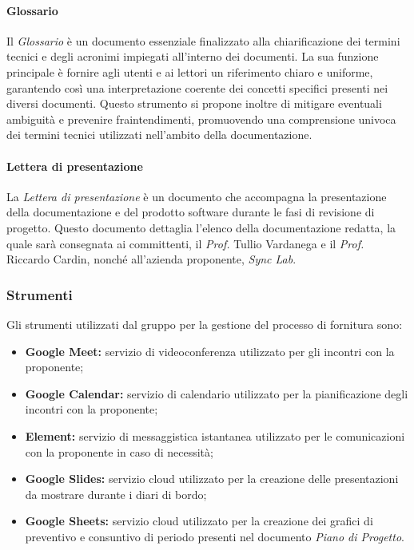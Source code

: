 \paragraph{Glossario}
Il \textit{Glossario} è un documento essenziale finalizzato alla chiarificazione dei termini tecnici e degli acronimi impiegati all'interno dei documenti. La sua funzione principale è fornire agli utenti e ai lettori un riferimento chiaro e uniforme, garantendo così una interpretazione coerente dei concetti specifici presenti nei diversi documenti. Questo strumento si propone inoltre di mitigare eventuali ambiguità e prevenire fraintendimenti, promuovendo una comprensione univoca dei termini tecnici utilizzati nell'ambito della documentazione.

\paragraph{Lettera di presentazione}
La \textit{Lettera di presentazione} è un documento che accompagna la presentazione della documentazione e del prodotto software durante le fasi di revisione di progetto. Questo documento dettaglia l'elenco della documentazione redatta, la quale sarà consegnata ai committenti, il \textit{Prof.} Tullio Vardanega e il \textit{Prof.} Riccardo Cardin, nonché all'azienda proponente, \textit{Sync Lab}.

\subsubsection{Strumenti}
Gli strumenti utilizzati dal gruppo per la gestione del processo di fornitura sono: 
\begin{itemize}
    \item \textbf{Google Meet:}
    servizio di videoconferenza utilizzato per gli incontri con la proponente;
    \item \textbf{Google Calendar:}
    servizio di calendario utilizzato per la pianificazione degli incontri con la proponente;
    \item \textbf{Element:}
    servizio di messaggistica istantanea utilizzato per le comunicazioni con la proponente in caso di necessità;
    \item \textbf{Google Slides:}
    servizio cloud utilizzato per la creazione delle presentazioni da mostrare durante i diari di bordo;
    \item \textbf{Google Sheets:} servizio cloud utilizzato per la creazione dei grafici di preventivo e consuntivo di periodo presenti nel documento \textit{Piano di Progetto}.
\end{itemize}


